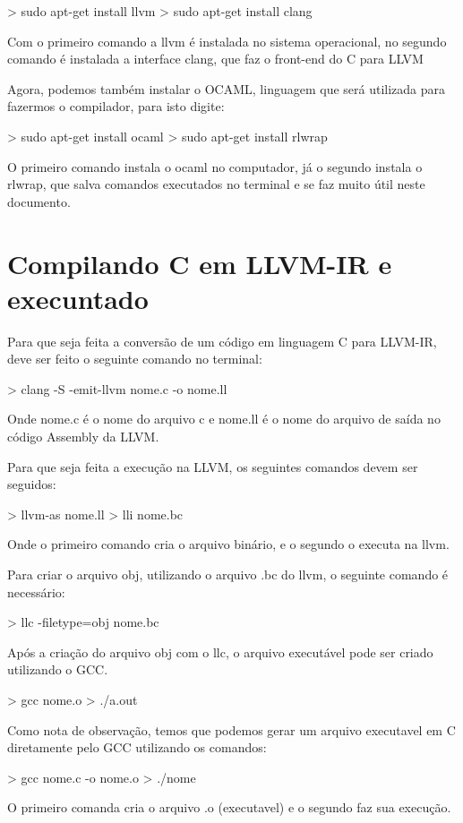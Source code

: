 \documentclass[12pt,a4paper,twoside]{report}
\begin{document}
\begin{terminal}
> sudo apt-get install llvm
> sudo apt-get install clang
\end{terminal}

Com o primeiro comando a llvm é instalada no sistema operacional, no segundo comando é instalada a interface clang, que faz o front-end do C para LLVM

Agora, podemos também instalar o OCAML, linguagem que será utilizada para fazermos o compilador, para isto digite:
\begin{terminal}
> sudo apt-get install ocaml
> sudo apt-get install rlwrap
\end{terminal}

O primeiro comando instala o ocaml no computador, já o segundo instala o rlwrap, que salva comandos executados no terminal e se faz muito útil neste documento.

\section{Compilando C em LLVM-IR e execuntado}
Para que seja feita a conversão de um código em linguagem C para LLVM-IR, deve ser feito o seguinte comando no terminal:

\begin{terminal}
> clang -S -emit-llvm nome.c -o nome.ll
\end{terminal}
Onde nome.c é o nome do arquivo c e nome.ll é o nome do arquivo de saída no código Assembly da LLVM.

Para que seja feita a execução na LLVM, os seguintes comandos devem ser seguidos:
\begin{terminal}
> llvm-as nome.ll
> lli nome.bc
\end{terminal}
Onde o primeiro comando cria o arquivo binário, e o segundo o executa na llvm.

Para criar o arquivo obj, utilizando o arquivo .bc do llvm, o seguinte comando é necessário:
\begin{terminal}
> llc -filetype=obj nome.bc
\end{terminal}

Após a criação do arquivo obj com o llc, o arquivo executável pode ser criado utilizando o GCC.
\begin{terminal}
> gcc nome.o
> ./a.out
\end{terminal}

Como nota de observação, temos que podemos gerar um arquivo executavel em C diretamente pelo GCC utilizando os comandos:
\begin{terminal}
> gcc nome.c -o nome.o
> ./nome
\end{terminal}
O primeiro comanda cria o arquivo .o (executavel) e o segundo faz sua execução.
\end{document}

